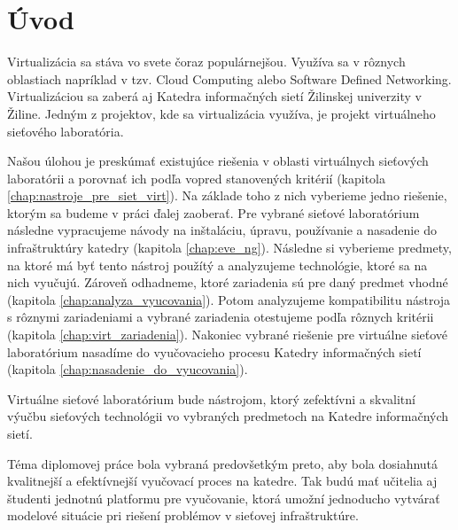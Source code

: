 \chapter*{Úvod}

Virtualizácia sa stáva vo svete čoraz populárnejšou. Využíva sa v rôznych oblastiach napríklad v tzv. Cloud Computing alebo Software Defined Networking. Virtualizáciou sa zaberá aj Katedra informačných sietí Žilinskej univerzity v Žiline. Jedným z projektov, kde sa virtualizácia využíva, je projekt virtuálneho sieťového laboratória. 

Našou úlohou je preskúmať existujúce riešenia v oblasti virtuálnych sieťových laboratórii a porovnať ich podľa vopred stanovených kritérií (kapitola \ref{chap:nastroje_pre_siet_virt}). Na základe toho z nich vyberieme jedno riešenie, ktorým sa budeme v práci ďalej zaoberať. Pre vybrané sieťové laboratórium následne vypracujeme návody na inštaláciu, úpravu, používanie a nasadenie do infraštruktúry katedry (kapitola \ref{chap:eve_ng}). Následne si vyberieme predmety, na ktoré má byť tento nástroj použítý a analyzujeme technológie, ktoré sa na nich vyučujú. Zároveň odhadneme, ktoré zariadenia sú pre daný predmet vhodné (kapitola \ref{chap:analyza_vyucovania}). Potom analyzujeme kompatibilitu nástroja s rôznymi zariadeniami a vybrané zariadenia otestujeme podľa rôznych kritérii (kapitola \ref{chap:virt_zariadenia}). Nakoniec vybrané riešenie pre virtuálne sieťové laboratórium nasadíme do vyučovacieho procesu Katedry informačných sietí (kapitola \ref{chap:nasadenie_do_vyucovania}).

Virtuálne sieťové laboratórium bude nástrojom, ktorý zefektívni a skvalitní výučbu sieťových technológii vo vybraných predmetoch na Katedre informačných sietí.

Téma diplomovej práce bola vybraná predovšetkým preto, aby bola dosiahnutá kvalitnejší a efektívnejší vyučovací proces na katedre. Tak budú mať učitelia aj študenti jednotnú platformu pre vyučovanie, ktorá umožní jednoducho vytvárať modelové situácie pri riešení problémov v sieťovej infraštruktúre.